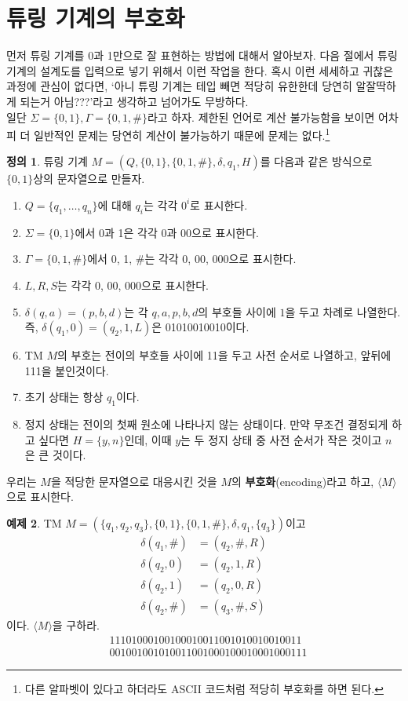 \documentclass[b5paper, 11pt]{book}
\theoremstyle{definition}
\newtheorem{defn}{정의}[chapter]
\newtheorem{ex}[defn]{예제}
\begin{document}
\section{튜링 기계의 부호화}
먼저 튜링 기계를 0과 1만으로 잘 표현하는 방법에 대해서 알아보자. 다음 절에서 튜링 기계의 설계도를 
입력으로 넣기 위해서 이런 작업을 한다. 혹시 이런 세세하고 귀찮은 과정에 관심이 없다면, `아니 튜링 기계는
테입 빼면 적당히 유한한데 당연히 알잘딱하게 되는거 아님???'라고 생각하고 넘어가도 무방하다.\\ 
일단 $\Sigma = \{0, 1\}, \Gamma = \{0, 1, \#\}$라고 하자. 제한된 언어로 계산 불가능함을 보이면 어차피 더 일반적인 문제는 당연히 계산이 불가능하기 때문에 문제는 없다.\footnote{다른 알파벳이 있다고 하더라도 ASCII 코드처럼 적당히 부호화를 하면 된다.} \\ 
\begin{defn}\label{TM encoding}
    튜링 기계 $M = (Q, \{0,1\}, \{0, 1, \#\}, \delta, q_1, H)$를 다음과 같은 방식으로
    $\{0,1\}$상의 문자열으로 만들자.
    \begin{enumerate}
        \item $Q = \{q_1, \ldots, q_n\}$에 대해 $q_i$는 각각 $0^i$로 표시한다. 
        \item $\Sigma = \{0,1\}$에서 0과 1은 각각 0과 00으로 표시한다. 
        \item $\Gamma = \{0,1,\#\}$에서 0, 1, \#는 각각 0, 00, 000으로 표시한다.
        \item $L, R, S$는 각각 0, 00, 000으로 표시한다.
        \item $\delta(q,a) = (p, b, d)$는 각 $q,a,p,b,d$의 부호들 사이에 $1$을 두고
        차례로 나열한다. 즉, $\delta(q_1, 0) = (q_2, 1, L)$은 01010010010이다. 
        \item TM $M$의 부호는 전이의 부호들 사이에 11을 두고 사전 순서로 나열하고, 앞뒤에 111을 붙인것이다. 
        \item 초기 상태는 항상 $q_1$이다. 
        \item 정지 상태는 전이의 첫째 원소에 나타나지 않는 상태이다. 만약 무조건 결정되게 하고 싶다면 $H = \{y, n\}$인데, 이때 $y$는 두 정지 상태 중 사전 순서가 작은 것이고 $n$은 큰 것이다.
    \end{enumerate}
    우리는 $M$을 적당한 문자열으로 대응시킨 것을 $M$의 \textbf{부호화}(encoding)라고 하고, $\langle M \rangle$으로 표시한다.
\end{defn}
\begin{ex}
    TM $M = (\{q_1, q_2, q_3\}, \{0, 1\}, \{0, 1, \#\}, \delta , q_1, \{q_3\})$이고 
    \begin{align*}
        \delta(q_1, \#) &= (q_2, \# , R) \\ 
        \delta(q_2, 0) &= (q_2, 1, R) \\ 
        \delta(q_2, 1) &= (q_2, 0, R) \\ 
        \delta(q_2, \#) &= (q_3, \#, S) 
    \end{align*}
    이다. $\langle M \rangle$을 구하라. 
    \begin{align*}
        &11101000100100010011001010010010011\\ 
        &001001001010011001000100010001000111
    \end{align*}
\end{ex}
\end{document}
